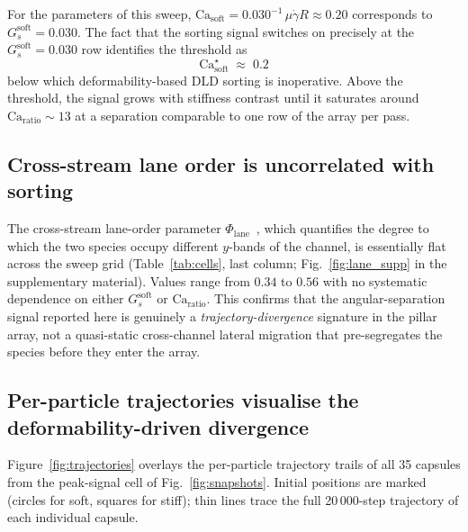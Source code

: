 \documentclass[11pt,a4paper]{article}
\begin{document}
For the parameters of this sweep,
$\mathrm{Ca}_{\text{soft}} = 0.030^{-1}\,\mu\dot{\gamma} R \approx 0.20$
corresponds to $G_s^{\text{soft}} = 0.030$. The fact that the
sorting signal switches on precisely at the $G_s^{\text{soft}} =
0.030$ row identifies the threshold as
\begin{equation}
  \mathrm{Ca}_{\text{soft}}^\star \;\approx\; 0.2
  \label{eq:threshold}
\end{equation}
below which deformability-based DLD sorting is inoperative. Above
the threshold, the signal grows with stiffness contrast until it
saturates around $\mathrm{Ca}_{\text{ratio}} \sim 13$ at a
separation comparable to one row of the array per pass.

\subsection{Cross-stream lane order is uncorrelated with sorting}
\label{sec:results-lane}

The cross-stream lane-order parameter
$\Phi_{\text{lane}}$~\citep{forterre2008flows},
which quantifies the degree to which the two species occupy
different $y$-bands of the channel, is essentially flat across the
sweep grid (Table~\ref{tab:cells}, last column;
Fig.~\ref{fig:lane_supp} in the supplementary material). Values
range from $0.34$ to $0.56$ with no systematic dependence on either
$G_s^{\text{soft}}$ or $\mathrm{Ca}_{\text{ratio}}$. This confirms
that the angular-separation signal reported here is genuinely a
\emph{trajectory-divergence} signature in the pillar array, not a
quasi-static cross-channel lateral migration that pre-segregates
the species before they enter the array.

\subsection{Per-particle trajectories visualise the
deformability-driven divergence}
\label{sec:results-traj}

Figure~\ref{fig:trajectories} overlays the per-particle trajectory
trails of all 35 capsules from the peak-signal cell of
Fig.~\ref{fig:snapshots}. Initial positions are marked
(circles for soft, squares for stiff); thin lines trace the
full 20\,000-step trajectory of each individual capsule.
\end{document}

